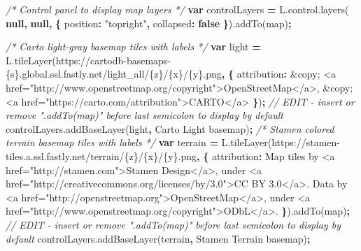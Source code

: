 \documentclass[
  english,
]{book}
\newenvironment{Shaded}{\begin{snugshade}}{\end{snugshade}}
\newcommand{\AttributeTok}[1]{\textcolor[rgb]{0.77,0.63,0.00}{#1}}
\newcommand{\CommentTok}[1]{\textcolor[rgb]{0.56,0.35,0.01}{\textit{#1}}}
\newcommand{\DataTypeTok}[1]{\textcolor[rgb]{0.13,0.29,0.53}{#1}}
\newcommand{\KeywordTok}[1]{\textcolor[rgb]{0.13,0.29,0.53}{\textbf{#1}}}
\newcommand{\NormalTok}[1]{#1}
\newcommand{\OperatorTok}[1]{\textcolor[rgb]{0.81,0.36,0.00}{\textbf{#1}}}
\newcommand{\StringTok}[1]{\textcolor[rgb]{0.31,0.60,0.02}{#1}}
\newcommand{\VariableTok}[1]{\textcolor[rgb]{0.00,0.00,0.00}{#1}}
\begin{document}
\begin{Shaded}
\begin{Highlighting}[]
\CommentTok{/* Control panel to display map layers */}
 \KeywordTok{var}\NormalTok{ controlLayers }\OperatorTok{=} \VariableTok{L}\NormalTok{.}\VariableTok{control}\NormalTok{.}\AttributeTok{layers}\NormalTok{( }\KeywordTok{null}\OperatorTok{,} \KeywordTok{null}\OperatorTok{,} \OperatorTok{\{}
  \DataTypeTok{position}\OperatorTok{:} \StringTok{"topright"}\OperatorTok{,}
  \DataTypeTok{collapsed}\OperatorTok{:} \KeywordTok{false}
 \OperatorTok{\}}\NormalTok{).}\AttributeTok{addTo}\NormalTok{(map)}\OperatorTok{;}

\CommentTok{/* Carto light{-}gray basemap tiles with labels */}
\KeywordTok{var}\NormalTok{ light }\OperatorTok{=} \VariableTok{L}\NormalTok{.}\AttributeTok{tileLayer}\NormalTok{(}\StringTok{\textquotesingle{}https://cartodb{-}basemaps{-}\{s\}.global.ssl.fastly.net/light\_all/\{z\}/\{x\}/\{y\}.png\textquotesingle{}}\OperatorTok{,} \OperatorTok{\{}
  \DataTypeTok{attribution}\OperatorTok{:} \StringTok{\textquotesingle{}\&copy; <a href="http://www.openstreetmap.org/copyright">OpenStreetMap</a>, \&copy; <a href="https://carto.com/attribution">CARTO</a>\textquotesingle{}}
\OperatorTok{\}}\NormalTok{)}\OperatorTok{;} \CommentTok{// EDIT {-} insert or remove ".addTo(map)" before last semicolon to display by default}
 \VariableTok{controlLayers}\NormalTok{.}\AttributeTok{addBaseLayer}\NormalTok{(light}\OperatorTok{,} \StringTok{\textquotesingle{}Carto Light basemap\textquotesingle{}}\NormalTok{)}\OperatorTok{;}
\CommentTok{/* Stamen colored terrain basemap tiles with labels */}
\KeywordTok{var}\NormalTok{ terrain }\OperatorTok{=} \VariableTok{L}\NormalTok{.}\AttributeTok{tileLayer}\NormalTok{(}\StringTok{\textquotesingle{}https://stamen{-}tiles.a.ssl.fastly.net/terrain/\{z\}/\{x\}/\{y\}.png\textquotesingle{}}\OperatorTok{,} \OperatorTok{\{}
  \DataTypeTok{attribution}\OperatorTok{:} \StringTok{\textquotesingle{}Map tiles by <a href="http://stamen.com">Stamen Design</a>, under <a href="http://creativecommons.org/licenses/by/3.0">CC BY 3.0</a>. Data by <a href="http://openstreetmap.org">OpenStreetMap</a>, under <a href="http://www.openstreetmap.org/copyright">ODbL</a>.\textquotesingle{}}
\OperatorTok{\}}\NormalTok{).}\AttributeTok{addTo}\NormalTok{(map)}\OperatorTok{;} \CommentTok{// EDIT {-} insert or remove ".addTo(map)" before last semicolon to display by default}
 \VariableTok{controlLayers}\NormalTok{.}\AttributeTok{addBaseLayer}\NormalTok{(terrain}\OperatorTok{,} \StringTok{\textquotesingle{}Stamen Terrain basemap\textquotesingle{}}\NormalTok{)}\OperatorTok{;}
\end{Highlighting}
\end{Shaded}
\end{document}
